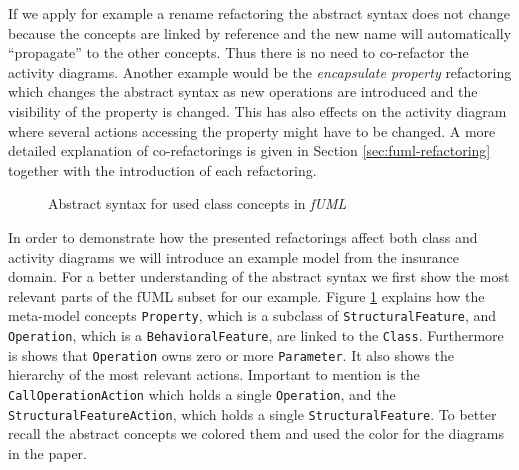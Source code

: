 \documentclass{llncs}
\begin{document}
If we apply for example a rename refactoring the abstract syntax does not change because the concepts are linked 
by reference and the new name will automatically ``propagate'' to the other concepts. Thus there is no need to 
co-refactor the activity diagrams. Another example would be the \textit{encapsulate property} refactoring which 
changes the abstract syntax as new operations are introduced and the visibility of the property is changed. This 
has also effects on the activity diagram where several actions accessing the property might have to be changed. 
A more detailed explanation of co-refactorings is given in Section \ref{sec:fuml-refactoring} together with the introduction of each 
refactoring.

\begin{figure}[h!t]
 \centering
 \caption{Abstract syntax for used class concepts in \textit{fUML}}
 \label{fig:fuml1}
\end{figure}

In order to demonstrate how the presented refactorings affect both class and activity diagrams we will introduce an example 
model from the insurance domain. For a better understanding of the abstract syntax we first show the most relevant parts of the fUML 
subset for our example. Figure \ref{fig:fuml1} explains how the meta-model concepts \texttt{Property}, which is a subclass of 
\texttt{Structural\-Feature}, and \texttt{Operation}, which is a \texttt{Behavioral\-Feature}, are linked to the \texttt{Class}. 
Furthermore is shows that \texttt{Operation} owns zero or more \texttt{Parameter}. It also shows the hierarchy of 
the most relevant actions. Important to mention is the \texttt{Call\-Operation\-Action} which holds a single \texttt{Operation}, 
and the \texttt{Structural\-Feature\-Action}, which holds a single \texttt{Structural\-Feature}. To better recall the abstract 
concepts we colored them and used the color for the diagrams in the paper.
\end{document}
